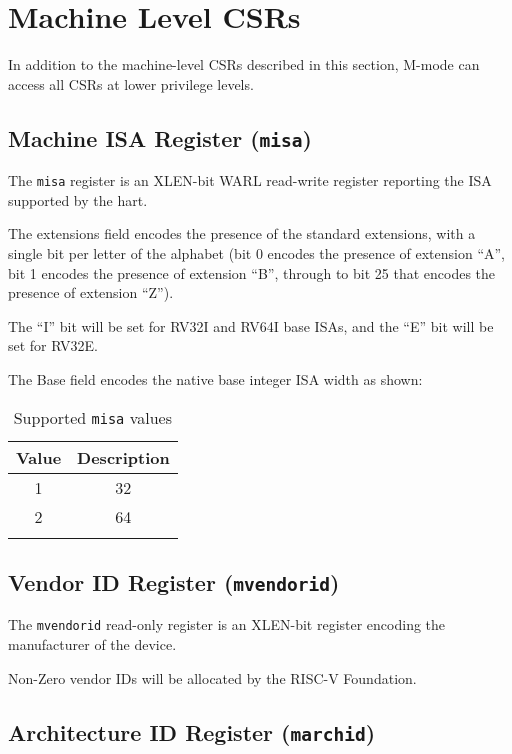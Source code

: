 \section{Machine Level CSRs}\label{machine-level-csrs}

In addition to the machine-level CSRs described in this section, M-mode
can access all CSRs at lower privilege levels.

\subsection{Machine ISA Register (\texttt{misa})}\label{machine-isa-register-misa}

The \texttt{misa} register is an XLEN-bit WARL read-write register reporting the
ISA supported by the hart.



The extensions field encodes the presence of the standard extensions,
with a single bit per letter of the alphabet (bit 0 encodes the presence
of extension ``A'', bit 1 encodes the presence of extension ``B'',
through to bit 25 that encodes the presence of extension ``Z'').

The ``I'' bit will be set for RV32I and RV64I base ISAs, and the ``E''
bit will be set for RV32E.

The Base field encodes the native base integer ISA width as shown:

\begin{longtable}[]{@{}cc@{}}
\toprule
Value & Description\tabularnewline
\midrule
\endhead
1 & 32\tabularnewline
2 & 64\tabularnewline
\bottomrule
\caption{Supported \texttt{misa} values}
\label{tab:misa-values}
\end{longtable}

\subsection{Vendor ID Register (\texttt{mvendorid})}\label{vendor-id-register-mvendorid}

The \texttt{mvendorid} read-only register is an XLEN-bit register encoding the
manufacturer of the device.



Non-Zero vendor IDs will be allocated by the RISC-V Foundation.

\subsection{Architecture ID Register
(\texttt{marchid})}\label{architecture-id-register-marchid}

